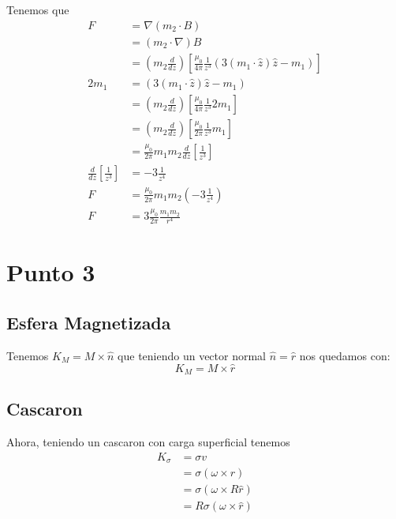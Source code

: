 \documentclass{report}
\begin{document}
\section{}

Tenemos que
\begin{align*}
  F &= \nabla (m_2 \cdot B)\\
  &= (m_2 \cdot \nabla)B\\
  &= \left(m_2 \frac{d}{dz} \right)\left[ \frac{\mu_0}{4\pi} \frac{1}{z^3} (3(m_1\cdot\hat{z})\hat{z} - m_1)\right]\\
  2 m_1 &= (3(m_1\cdot\hat{z})\hat{z} - m_1)\\
  &= \left(m_2 \frac{d}{dz} \right)\left[ \frac{\mu_0}{4\pi} \frac{1}{z^3} 2m_1\right]\\
  &= \left(m_2 \frac{d}{dz} \right)\left[ \frac{\mu_0}{2\pi} \frac{1}{z^3} m_1\right]\\
  &= \frac{\mu_0}{2\pi} m_1 m_2 \frac{d}{dz} \left[ \frac{1}{z^3} \right]\\
  \frac{d}{dz} \left[ \frac{1}{z^3} \right] &= - 3 \frac{1}{z^4}\\
  F &= \frac{\mu_0}{2\pi} m_1 m_2 \left( - 3 \frac{1}{z^4} \right)\\
  F &= 3 \frac{\mu_0}{2\pi} \frac{m_1m_2}{r^4}
\end{align*}

\chapter{Punto 3}

\section{Esfera Magnetizada}

Tenemos $K_M = M \times \hat{n}$ que teniendo un vector normal $\hat{n} = \hat{r}$ nos quedamos con:
\[
  K_M = M \times \hat{r}
\]

\section{Cascaron}

Ahora, teniendo un cascaron con carga superficial tenemos
\begin{align*}
  K_\sigma &= \sigma v\\
  &= \sigma (\omega \times r)\\
  &= \sigma (\omega \times R\hat{r})\\
  &= R\sigma (\omega \times \hat{r})
\end{align*}
\end{document}
